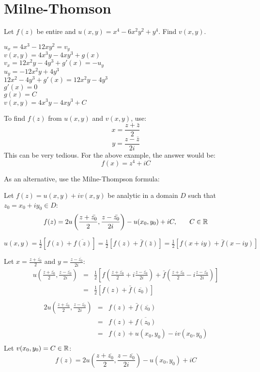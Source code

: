 \documentclass[letterpaper,12pt,fleqn]{article}
\newcommand{\conj}[1]{\bar{#1}}
\newcommand{\Conj}[1]{\overline{#1}}
\begin{document}
\section*{Milne-Thomson}

\begin{example}
  Let $f(z)$ be entire and $u(x,y)=x^4-6x^2y^2+y^4$. Find $v(x,y)$.

  $u_x=4x^3-12xy^2=v_y$ \\
  $v(x,y)=4x^3y-4xy^3+g(x)$ \\
  $v_x=12x^2y-4y^3+g'(x)=-u_y$ \\
  $u_y=-12x^2y+4y^3$ \\
  $12x^2-4y^3+g'(x)=12x^2y-4y^3$ \\
  $g'(x)=0$ \\
  $g(x)=C$ \\

  $v(x,y)=4x^3y-4xy^3+C$
\end{example}

To find $f(z)$ from $u(x,y)$ and $v(x,y)$, use:
\[x=\frac{z+\bar{z}}{2}\]
\[y=\frac{z-\bar{z}}{2i}\]
This can be very tedious. For the above example, the answer would be:
\[f(x)=z^4+iC\]

As an alternative, use the Milne-Thompson formula:

\begin{theorem}
  Let $f(z)=u(x,y)+iv(x,y)$ be analytic in a domain $D$ such that
  $z_0=x_0+iy_0\in D$:
  \[f(z)=2u\left(\frac{z+\conj{z_0}}{2},\frac{z-\conj{z_0}}{2i}\right)-
  u(x_0,y_0)+iC,\hspace{0.25in}C\in\R\]
\end{theorem}

\begin{theproof}
  $u(x,y)=\frac{1}{2}\left[f(z)+\Conj{f(z)}\right]=
  \frac{1}{2}\left[f(z)+\conj{f}(\conj{z})\right]=
  \frac{1}{2}\left[f(x+iy)+\conj{f}(x-iy)\right]$

  Let $x=\frac{z+\Conj{z_0}}{2}$ and $y=\frac{z-\Conj{z_0}}{2i}$:
  \begin{eqnarray*}
    u\left(\frac{z+\Conj{z_0}}{2},\frac{z-\Conj{z_0}}{2i}\right) &=&
    \frac{1}{2}\left[f(\frac{z+\Conj{z_0}}{2}+i\frac{z-\Conj{z_0}}{2i})+
      \conj{f}(\frac{z+\Conj{z_0}}{2}-i\frac{z-\Conj{z_0}}{2i})\right] \\
    &=& \frac{1}{2}\left[f(z)+\conj{f}(\Conj{z_0})\right] \\
  \end{eqnarray*}
  \begin{eqnarray*}
    2u\left(\frac{z+\Conj{z_0}}{2},\frac{z-\Conj{z_0}}{2i}\right) &=&
    f(z)+\conj{f}\left(\Conj{z_0}\right) \\
    &=& f(z)+\Conj{f(z_0)} \\
    &=& f(z)+u(x_0,y_0)-iv(x_0,y_0) \\
  \end{eqnarray*}
  Let $v(x_0,y_0)=C\in\mathbb{R}$:
  \[f(z)=2u\left(\frac{z+\Conj{z_0}}{2},\frac{z-\Conj{z_0}}{2i}\right)
  -u(x_0,y_0)+iC\]
\end{theproof}
\end{document}

